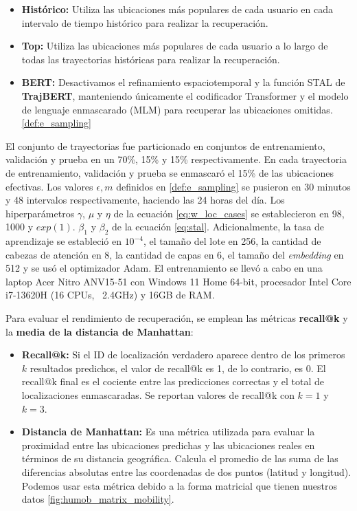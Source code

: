 \begin{itemize}
    \item \textbf{Histórico:} Utiliza las ubicaciones más populares de cada usuario en cada intervalo de tiempo histórico para realizar la recuperación.
    \item \textbf{Top:} Utiliza las ubicaciones más populares de cada usuario a lo largo de todas las trayectorias históricas para realizar la recuperación.
    \item \textbf{BERT:} Desactivamos el refinamiento espaciotemporal y la función STAL de \textbf{TrajBERT}, manteniendo únicamente el codificador Transformer y el modelo de lenguaje enmascarado (MLM) para recuperar las ubicaciones omitidas. \ref{def:e_sampling}
\end{itemize}

El conjunto de trayectorias fue particionado en conjuntos de entrenamiento, validación y prueba en un 70\%, 15\% y 15\% respectivamente. En cada trayectoria de entrenamiento, validación y prueba se enmascaró el 15\% de las ubicaciones efectivas. Los valores $\epsilon, m$ definidos en \ref{def:e_sampling} se pusieron en 30 minutos y 48 intervalos respectivamente, haciendo las 24 horas del día. Los hiperparámetros \(\gamma\), \(\mu\) y \(\eta\) de la ecuación \ref{eq:w_loc_cases} se establecieron en 98, 1000 y $exp(1)$. \(\beta_1\) y \(\beta_2\) de la ecuación \ref{eq:stal}. Adicionalmente, la tasa de aprendizaje se estableció en $10^{-4}$, el tamaño del lote en 256, la cantidad de cabezas de atención en 8, la cantidad de capas en 6, el tamaño del \textit{embedding} en 512 y se usó el optimizador Adam. El entrenamiento se llevó a cabo en una laptop Acer Nitro ANV15-51 con Windows 11 Home 64-bit, procesador Intel Core i7-13620H (16 CPUs, ~2.4GHz) y 16GB de RAM.

Para evaluar el rendimiento de recuperación, se emplean las métricas \textbf{recall@k}
y la \textbf{media de la distancia de Manhattan}:

\begin{itemize}
    \item \textbf{Recall@k:} Si el ID de localización verdadero aparece dentro de los primeros $k$ resultados predichos, el valor de recall@k es 1, de lo contrario, es 0. El recall@k final es el cociente entre las predicciones correctas y el total de localizaciones enmascaradas. Se reportan valores de recall@k con $k=1$ y $k=3$.
    \item \textbf{Distancia de Manhattan:} Es una métrica utilizada para evaluar la proximidad entre las ubicaciones predichas y las ubicaciones reales en términos de su distancia geográfica. Calcula el promedio de las suma de las diferencias absolutas entre las coordenadas de dos puntos (latitud y longitud). Podemos usar esta métrica debido a la forma matricial que tienen nuestros datos \ref{fig:humob_matrix_mobility}.
\end{itemize}

